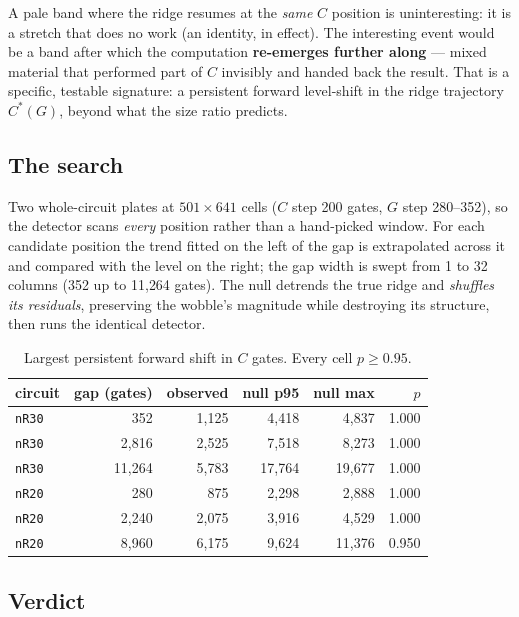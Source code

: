\documentclass[11pt]{article}
\newcommand{\code}[1]{\texttt{#1}}
\begin{document}
A pale band where the ridge resumes at the \emph{same} $C$ position is
uninteresting: it is a stretch that does no work (an identity, in effect).
The interesting event would be a band after which the computation
\textbf{re-emerges further along} --- mixed material that performed part of
$C$ invisibly and handed back the result. That is a specific, testable
signature: a persistent forward level-shift in the ridge trajectory
$C^*(G)$, beyond what the size ratio predicts.

\subsection{The search}

Two whole-circuit plates at $501 \times 641$ cells ($C$ step 200 gates,
$G$ step 280--352), so the detector scans \emph{every} position rather than
a hand-picked window. For each candidate position the trend fitted on the
left of the gap is extrapolated across it and compared with the level on the
right; the gap width is swept from 1 to 32 columns (352 up to 11{,}264
gates). The null detrends the true ridge and \emph{shuffles its residuals},
preserving the wobble's magnitude while destroying its structure, then runs
the identical detector.

\begin{table}[h]\centering\small
\begin{tabular}{lrrrrr}
\toprule
circuit & gap (gates) & observed & null p95 & null max & $p$ \\
\midrule
\code{nR30} & 352 & 1{,}125 & 4{,}418 & 4{,}837 & 1.000 \\
\code{nR30} & 2{,}816 & 2{,}525 & 7{,}518 & 8{,}273 & 1.000 \\
\code{nR30} & 11{,}264 & 5{,}783 & 17{,}764 & 19{,}677 & 1.000 \\
\code{nR20} & 280 & 875 & 2{,}298 & 2{,}888 & 1.000 \\
\code{nR20} & 2{,}240 & 2{,}075 & 3{,}916 & 4{,}529 & 1.000 \\
\code{nR20} & 8{,}960 & 6{,}175 & 9{,}624 & 11{,}376 & 0.950 \\
\bottomrule
\end{tabular}
\caption{Largest persistent forward shift in $C$ gates. Every cell $p \ge
0.95$.}
\end{table}

\subsection{Verdict}
\end{document}
